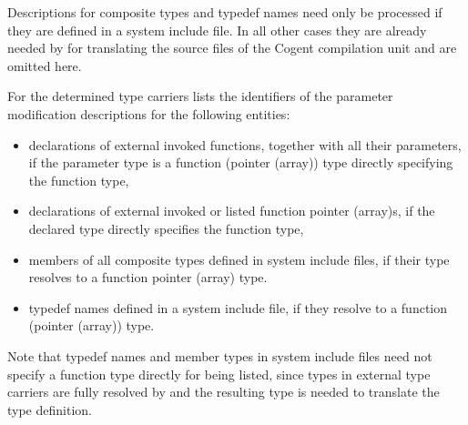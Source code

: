 Descriptions for composite types and typedef names need only be processed if they are defined in a system include
file. In all other cases they are already needed by  for translating the source files
of the Cogent compilation unit and are omitted here.

For the determined type carriers  lists the identifiers of 
the parameter modification descriptions for the following entities:
\begin{itemize}
\item declarations of external invoked functions, together with all their parameters, if the parameter
type is a function (pointer (array)) type directly specifying the function type,
\item declarations of external invoked or listed function pointer (array)s, if the declared type directly specifies
the function type,
\item members of all composite types defined in system include files, if their type resolves to a function pointer (array) type.
\item typedef names defined in a system include file, if they resolve to a function (pointer (array)) type.
\end{itemize}

Note that typedef names and member types in system include files need not specify a function type directly for being listed, 
since types in external type carriers are fully resolved by  and the resulting type is needed to translate 
the type definition.
